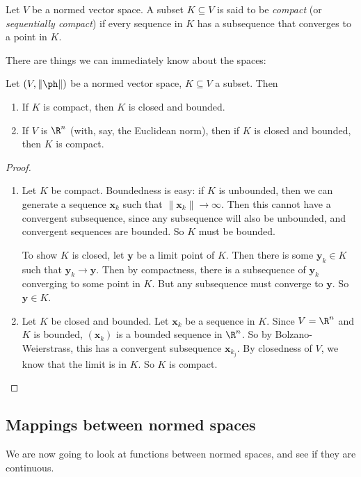 \documentclass[a4paper]{article}
\begin{document}
\begin{defi}
  Let $V$ be a normed vector space. A subset $K\subseteq V$ is said to be \emph{compact} (or \emph{sequentially compact}) if every sequence in $K$ has a subsequence that converges to a point in $K$.
\end{defi}

There are things we can immediately know about the spaces:
\begin{thm}
  Let $(V, \|\ph\|)$ be a normed vector space, $K\subseteq V$ a subset. Then
  \begin{enumerate}
    \item If $K$ is compact, then $K$ is closed and bounded.
    \item If $V$ is $\R^n$ (with, say, the Euclidean norm), then if $K$ is closed and bounded, then $K$ is compact.
  \end{enumerate}
\end{thm}

\begin{proof}\leavevmode
  \begin{enumerate}
    \item Let $K$ be compact. Boundedness is easy: if $K$ is unbounded, then we can generate a sequence $\mathbf{x}_k$ such that $\|\mathbf{x}_k\| \to \infty$. Then this cannot have a convergent subsequence, since any subsequence will also be unbounded, and convergent sequences are bounded. So $K$ must be bounded.

      To show $K$ is closed, let $\mathbf{y}$ be a limit point of $K$. Then there is some $\mathbf{y}_k \in K$ such that $\mathbf{y}_k \to \mathbf{y}$. Then by compactness, there is a subsequence of $\mathbf{y}_k$ converging to some point in $K$. But any subsequence must converge to $\mathbf{y}$. So $\mathbf{y} \in K$.

    \item Let $K$ be closed and bounded. Let $\mathbf{x}_k$ be a sequence in $K$. Since $V = \R^n$ and $K$ is bounded, $(\mathbf{x}_k)$ is a bounded sequence in $\R^n$. So by Bolzano-Weierstrass, this has a convergent subsequence $\mathbf{x}_{k_j}$. By closedness of $V$, we know that the limit is in $K$. So $K$ is compact.
  \end{enumerate}
\end{proof}

\subsection{Mappings between normed spaces}
We are now going to look at functions between normed spaces, and see if they are continuous.
\end{document}
